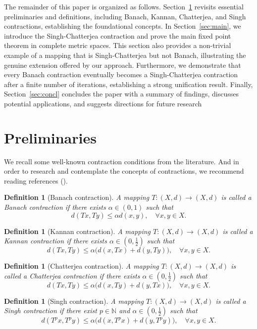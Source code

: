 \documentclass[12pt]{article}
\newtheorem{definition}[theorem]{Definition}
\begin{document}
The remainder of this paper is organized as follows. Section~\ref{sec:pre} revisits essential preliminaries and definitions, including Banach, Kannan, Chatterjea, and Singh contractions, establishing the foundational concepts. In Section~\ref{sec:main}, we introduce the Singh-Chatterjea contraction and prove the main fixed point theorem in complete metric spaces. This section also provides a non-trivial example of a mapping that is Singh-Chatterjea but not Banach, illustrating the genuine extension offered by our approach. Furthermore, we demonstrate that every Banach contraction eventually becomes a Singh-Chatterjea contraction after a finite number of iterations, establishing a strong unification result. Finally, Section~\ref{sec:concl} concludes the paper with a summary of findings, discusses potential applications, and suggests directions for future research

\section{Preliminaries}
\label{sec:pre}
We recall some well-known contraction conditions from the literature. And in order to research and contemplate the concepts of contractions, we recommend reading references (\cite{Banach1922,Kannan1968,Chatterjea1972,Singh1977,Singh1969,Fisher1974,Rhoades2001,Rus2001,Berinde2007,Cvetković2025}).

\begin{definition}[Banach contraction]
A mapping $T:(X,d)\to(X,d)$ is called a \textit{Banach contraction} if there exists $\alpha \in (0,1)$ such that
\[
d(Tx,Ty) \leq \alpha d(x,y), \quad \forall x,y \in X.
\]
\end{definition}

\begin{definition}[Kannan contraction]
A mapping $T:(X,d)\to(X,d)$ is called a \textit{Kannan contraction} if there exists $\alpha \in (0,\tfrac{1}{2})$ such that
\[
d(Tx,Ty) \leq \alpha \big(d(x,Tx) + d(y,Ty)\big), \quad \forall x,y \in X.
\]
\end{definition}

\begin{definition}[Chatterjea contraction]
A mapping $T:(X,d)\to(X,d)$ is called a \textit{Chatterjea contraction} if there exists $\alpha \in (0,\tfrac{1}{2})$ such that
\[
d(Tx,Ty) \leq \alpha \big(d(x,Ty) + d(y,Tx)\big), \quad \forall x,y \in X.
\]
\end{definition}

\begin{definition}[Singh contraction]
A mapping $T:(X,d)\to(X,d)$ is called a \textit{Singh contraction} if there exist $p \in \mathbb{N}$ and $\alpha \in (0,\tfrac{1}{2})$ such that
\[
d(T^p x, T^p y) \leq \alpha \big(d(x,T^p x) + d(y,T^p y)\big), \quad \forall x,y \in X.
\]
\end{definition}
\end{document}
